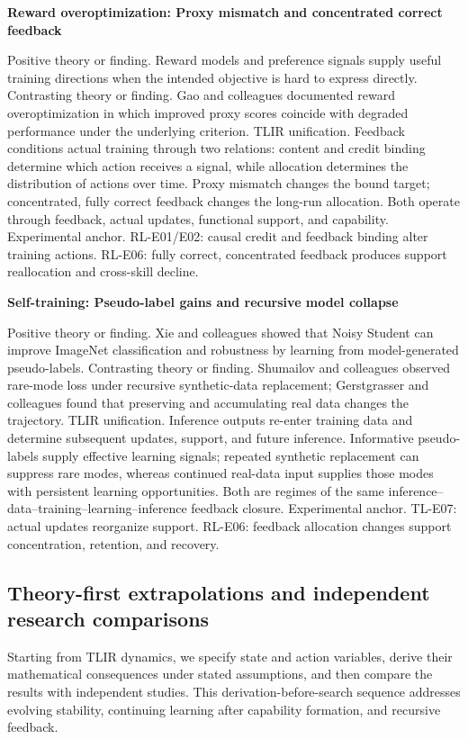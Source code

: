 \documentclass[12pt,letterpaper]{article}
\begin{document}
\noindent\textbf{Reward overoptimization: Proxy mismatch and concentrated correct feedback}\par
Positive theory or finding. Reward models and preference signals supply useful training directions when the intended objective is hard to express directly.
Contrasting theory or finding. Gao and colleagues documented reward overoptimization in which improved proxy scores coincide with degraded performance under the underlying criterion. \cite{gao2023}
TLIR unification. Feedback conditions actual training through two relations: content and credit binding determine which action receives a signal, while allocation determines the distribution of actions over time. Proxy mismatch changes the bound target; concentrated, fully correct feedback changes the long-run allocation. Both operate through feedback, actual updates, functional support, and capability.
Experimental anchor. RL-E01/E02: causal credit and feedback binding alter training actions. RL-E06: fully correct, concentrated feedback produces support reallocation and cross-skill decline.

\noindent\textbf{Self-training: Pseudo-label gains and recursive model collapse}\par
Positive theory or finding. Xie and colleagues showed that Noisy Student can improve ImageNet classification and robustness by learning from model-generated pseudo-labels. \cite{xie2020}
Contrasting theory or finding. Shumailov and colleagues observed rare-mode loss under recursive synthetic-data replacement; Gerstgrasser and colleagues found that preserving and accumulating real data changes the trajectory. \cite{shumailov2024,gerstgrasser2024}
TLIR unification. Inference outputs re-enter training data and determine subsequent updates, support, and future inference. Informative pseudo-labels supply effective learning signals; repeated synthetic replacement can suppress rare modes, whereas continued real-data input supplies those modes with persistent learning opportunities. Both are regimes of the same inference--data--training--learning--inference feedback closure.
Experimental anchor. TL-E07: actual updates reorganize support. RL-E06: feedback allocation changes support concentration, retention, and recovery.

\subsection{Theory-first extrapolations and independent research comparisons}
Starting from TLIR dynamics, we specify state and action variables, derive their mathematical consequences under stated assumptions, and then compare the results with independent studies. This derivation-before-search sequence addresses evolving stability, continuing learning after capability formation, and recursive feedback.
\end{document}
